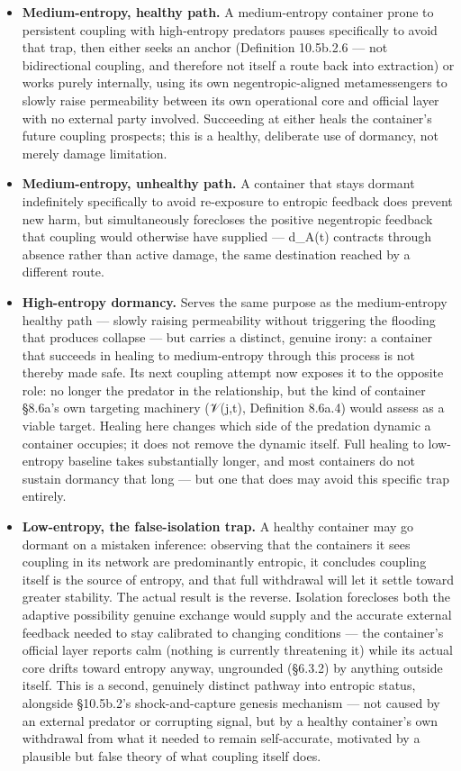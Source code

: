 \documentclass[
]{article}
\begin{document}
\begin{itemize}
\item
  \textbf{Medium-entropy, healthy path.} A medium-entropy container
  prone to persistent coupling with high-entropy predators pauses
  specifically to avoid that trap, then either seeks an anchor
  (Definition 10.5b.2.6 --- not bidirectional coupling, and therefore
  not itself a route back into extraction) or works purely internally,
  using its own negentropic-aligned metamessengers to slowly raise
  permeability between its own operational core and official layer with
  no external party involved. Succeeding at either heals the container's
  future coupling prospects; this is a healthy, deliberate use of
  dormancy, not merely damage limitation.
\item
  \textbf{Medium-entropy, unhealthy path.} A container that stays
  dormant indefinitely specifically to avoid re-exposure to entropic
  feedback does prevent new harm, but simultaneously forecloses the
  positive negentropic feedback that coupling would otherwise have
  supplied --- d\_A(t) contracts through absence rather than active
  damage, the same destination reached by a different route.
\item
  \textbf{High-entropy dormancy.} Serves the same purpose as the
  medium-entropy healthy path --- slowly raising permeability without
  triggering the flooding that produces collapse --- but carries a
  distinct, genuine irony: a container that succeeds in healing to
  medium-entropy through this process is not thereby made safe. Its next
  coupling attempt now exposes it to the opposite role: no longer the
  predator in the relationship, but the kind of container §8.6a's own
  targeting machinery (𝒱(j,t), Definition 8.6a.4) would assess as a
  viable target. Healing here changes which side of the predation
  dynamic a container occupies; it does not remove the dynamic itself.
  Full healing to low-entropy baseline takes substantially longer, and
  most containers do not sustain dormancy that long --- but one that
  does may avoid this specific trap entirely.
\item
  \textbf{Low-entropy, the false-isolation trap.} A healthy container
  may go dormant on a mistaken inference: observing that the containers
  it sees coupling in its network are predominantly entropic, it
  concludes coupling itself is the source of entropy, and that full
  withdrawal will let it settle toward greater stability. The actual
  result is the reverse. Isolation forecloses both the adaptive
  possibility genuine exchange would supply and the accurate external
  feedback needed to stay calibrated to changing conditions --- the
  container's official layer reports calm (nothing is currently
  threatening it) while its actual core drifts toward entropy anyway,
  ungrounded (§6.3.2) by anything outside itself. This is a second,
  genuinely distinct pathway into entropic status, alongside §10.5b.2's
  shock-and-capture genesis mechanism --- not caused by an external
  predator or corrupting signal, but by a healthy container's own
  withdrawal from what it needed to remain self-accurate,
  motivated by a plausible but false theory of what coupling itself
  does.
\end{itemize}
\end{document}
